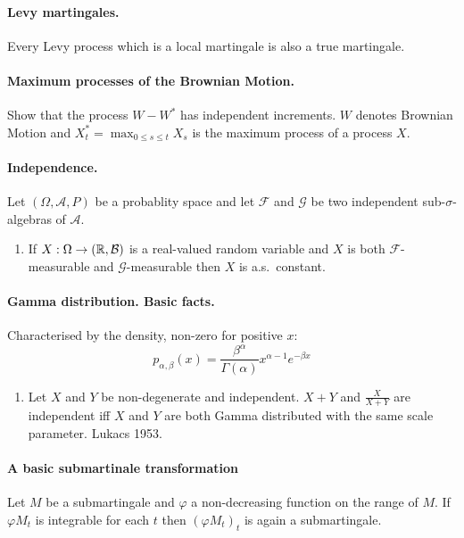 \paragraph{Levy martingales.  } Every Levy process which is a local martingale is also a true martingale.


\paragraph{Maximum processes of the Brownian Motion. } 
Show that the process $W - W^*$ has independent increments. $W$ denotes
Brownian Motion and $X^*_t= \max_{0 \leq s \leq t} X_s$ is the maximum process of 
a \cadlag process $X$.



\paragraph{Independence. }
Let $(\Omega, \mathcal A, P)$ be a probablity space and let $\mathcal F$ and
$\mathcal G$ be two independent sub-$\sigma$-algebras of $\mathcal A$.

\begin{enumerate} 
\item If $X: \Omega \to (\mathbb R, \mathcal B)$ is a
    real-valued random variable and $X$ is both $\mathcal F$-measurable
    and $\mathcal G$-measurable then $X$ is a.s.~constant.
\end{enumerate}


\paragraph{Gamma distribution. Basic facts. }

Characterised by the density, non-zero for positive $x$:
\begin{equation}
p_{\alpha, \beta}(x) = \frac{\beta^\alpha}{ \Gamma(\alpha)} x^{\alpha-1}e^{-\beta x}
\end{equation}

\begin{enumerate}
\item Let $X$ and $Y$ be non-degenerate and independent. 
    $X+Y$ and $\frac{X}{X+Y}$ are independent iff $X$ and $Y$
    are both Gamma distributed with the same scale parameter. 
    \src Lukacs 1953.
\end{enumerate}





\paragraph{A basic submartinale transformation}
Let $M$ be a submartingale and $\varphi$ a non-decreasing function
on the range of $M$. If $\varphi M_t$ is integrable for each $t$ then 
$\left( \varphi M_t \right)_t$ is again a submartingale.




